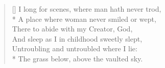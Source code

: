\documentclass[MAIN]{subfiles}
\begin{document}
\settowidth{\versewidth}{I long for scenes, where man hath never trod,}
\begin{verse}[\versewidth]
I long for scenes, where man hath never trod,\\*
\vin A place where woman never smiled or wept,\\
There to abide with my Creator, God,\\
\vin And sleep as I in childhood sweetly slept,\\
Untroubling and untroubled where I lie:\\*
The grass below, above the vaulted sky.\end{verse}
\end{document}
